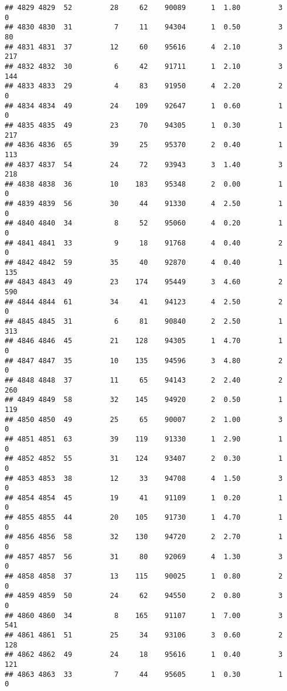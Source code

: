 \documentclass[
]{article}
\begin{document}
\begin{verbatim}
## 4829 4829  52         28     62    90089      1  1.80         3        0
## 4830 4830  31          7     11    94304      1  0.50         3       80
## 4831 4831  37         12     60    95616      4  2.10         3      217
## 4832 4832  30          6     42    91711      1  2.10         3      144
## 4833 4833  29          4     83    91950      4  2.20         2        0
## 4834 4834  49         24    109    92647      1  0.60         1        0
## 4835 4835  49         23     70    94305      1  0.30         1      217
## 4836 4836  65         39     25    95370      2  0.40         1      113
## 4837 4837  54         24     72    93943      3  1.40         3      218
## 4838 4838  36         10    183    95348      2  0.00         1        0
## 4839 4839  56         30     44    91330      4  2.50         1        0
## 4840 4840  34          8     52    95060      4  0.20         1        0
## 4841 4841  33          9     18    91768      4  0.40         2        0
## 4842 4842  59         35     40    92870      4  0.40         1      135
## 4843 4843  49         23    174    95449      3  4.60         2      590
## 4844 4844  61         34     41    94123      4  2.50         2        0
## 4845 4845  31          6     81    90840      2  2.50         1      313
## 4846 4846  45         21    128    94305      1  4.70         1        0
## 4847 4847  35         10    135    94596      3  4.80         2        0
## 4848 4848  37         11     65    94143      2  2.40         2      260
## 4849 4849  58         32    145    94920      2  0.50         1      119
## 4850 4850  49         25     65    90007      2  1.00         3        0
## 4851 4851  63         39    119    91330      1  2.90         1        0
## 4852 4852  55         31    124    93407      2  0.30         1        0
## 4853 4853  38         12     33    94708      4  1.50         3        0
## 4854 4854  45         19     41    91109      1  0.20         1        0
## 4855 4855  44         20    105    91730      1  4.70         1        0
## 4856 4856  58         32    130    94720      2  2.70         1        0
## 4857 4857  56         31     80    92069      4  1.30         3        0
## 4858 4858  37         13    115    90025      1  0.80         2        0
## 4859 4859  50         24     62    94550      2  0.80         3        0
## 4860 4860  34          8    165    91107      1  7.00         3      541
## 4861 4861  51         25     34    93106      3  0.60         2      128
## 4862 4862  49         24     18    95616      1  0.40         3      121
## 4863 4863  33          7     44    95605      1  0.30         1        0

\end{verbatim}
\end{document}
